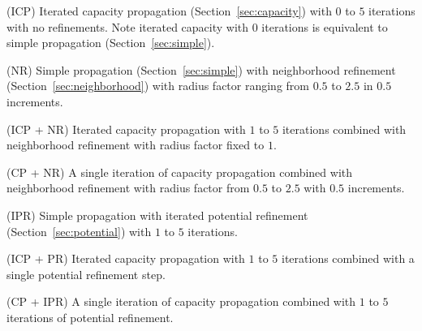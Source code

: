 \documentclass[twoside,11pt]{article}
\begin{document}
\begin{compactenum}
  \item (ICP) Iterated capacity propagation (Section~\ref{sec:capacity}) with
    $0$ to $5$ iterations with no refinements. Note iterated capacity with $0$
    iterations is equivalent to simple propagation (Section~\ref{sec:simple}).
  \item (NR) Simple propagation (Section~\ref{sec:simple}) with neighborhood
    refinement (Section~\ref{sec:neighborhood}) with radius factor ranging from
    $0.5$ to $2.5$ in $0.5$ increments.
  \item (ICP + NR) Iterated capacity propagation with $1$ to $5$ iterations
    combined with neighborhood refinement with radius factor fixed to $1$.
  \item (CP + NR) A single iteration of capacity propagation combined with
    neighborhood refinement with radius factor from $0.5$ to $2.5$ with $0.5$
    increments.
  \item (IPR) Simple propagation with iterated potential refinement
    (Section~\ref{sec:potential}) with $1$ to $5$ iterations.  
  \item (ICP + PR) Iterated capacity propagation with $1$ to $5$ iterations
    combined with a single potential refinement step.
  \item (CP + IPR) A single iteration of capacity propagation combined with
    $1$ to $5$ iterations of potential refinement.
\end{compactenum}
\end{document}
